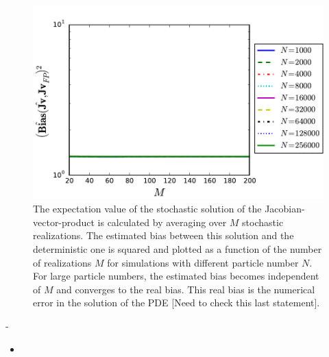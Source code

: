\documentclass[]{article}
\begin{document}
\begin{figure}
\includegraphics[width=14.5cm]{../Problems/WeightedParticles/checkSystem/plots/Bias_Jv_M_N.pdf}
\caption{The expectation value of the stochastic solution of the Jacobian-vector-product is calculated by averaging over $M$ stochastic realizations. The estimated bias between this solution and the deterministic one is squared and plotted as a function of the number of realizations $M$ for simulations with different particle number $N$.  For large particle numbers, the estimated bias becomes independent of $M$ and converges to the real bias. This real bias is the numerical error in the solution of the PDE [Need to check this last statement].}
\label{Bias_Jv_M_N}
\end{figure}-

\begin{itemize}
\item
\end{itemize}


%
%
\end{document}

